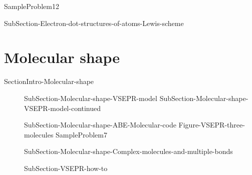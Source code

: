 \documentclass[main.tex]{subfiles}
\begin{document}
{\begin{description}
{SampleProblem12}

\item[\docfilehook{Steps to obtain Lewis structures}{}]{SubSection-Electron-dot-structures-of-atoms-Lewis-scheme}  

\end{description}

 \section{Molecular shape}{SectionIntro-Molecular-shape}
\sloppy\begin{description}
\item[] {SubSection-Molecular-shape-VSEPR-model}
 \hspace{10cm}{Figure-VSEPR-three-molecules-one}
 {SubSection-Molecular-shape-VSEPR-model-continued}
\item[] {SubSection-Molecular-shape-ABE-Molecular-code}
{Figure-VSEPR-three-molecules}
{SampleProblem7}

\item[] {SubSection-Molecular-shape-Complex-molecules-and-multiple-bonds}
\item[]{SubSection-VSEPR-how-to}  
\newpage  \hspace{0cm}{Table-Molecular-geometries}

\end{description}


}
\end{document}
